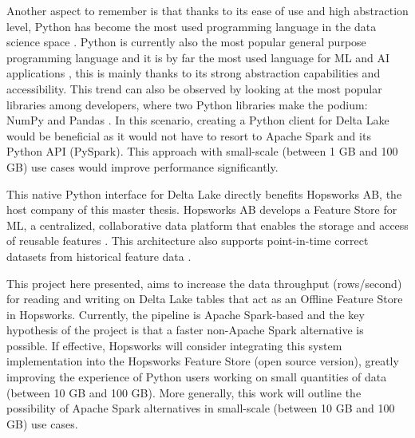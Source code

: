 Another aspect to remember is that thanks to its ease of use and high abstraction level, Python has become the most used programming language in the data science space \cite{nagpalPythonDataAnalytics2019}. Python is currently also the most popular general purpose programming language \cite{TIOBEIndex, StackOverflowDeveloper} and it is by far the most used language for \gls{ML} and \gls{AI} applications \cite{python-machine-learning}, this is mainly thanks to its strong abstraction capabilities and accessibility. This trend can also be observed by looking at the most popular libraries among developers, where two Python libraries make the podium: NumPy and Pandas \cite{StackOverflowDeveloper}.
In this scenario, creating a Python client for Delta Lake would be beneficial as it would not have to resort to Apache Spark and its Python \gls{API} (PySpark). This approach with small-scale (between 1 GB and 100 GB) use cases would improve performance significantly.

This native Python interface for Delta Lake directly benefits Hopsworks AB, the host company of this master thesis. Hopsworks AB develops a Feature Store for \gls{ML}, a centralized, collaborative data platform that enables the storage and access of reusable features \cite{HopsworksBatchRealtime2024}. This architecture also supports point-in-time correct datasets from historical feature data \cite{Pettersson1695672}.

This project here presented, aims to increase the data throughput (rows/second) for reading and writing on Delta Lake tables that act as an Offline Feature Store in Hopsworks. Currently, the pipeline is Apache Spark-based and the key hypothesis of the project is that a faster non-Apache Spark alternative is possible. If effective, Hopsworks will consider integrating this system implementation into the Hopsworks Feature Store (open source version), greatly improving the experience of Python users working on small quantities of data (between 10 GB and 100 GB). More generally, this work will outline the possibility of Apache Spark alternatives in small-scale (between 10 GB and 100 GB) use cases.